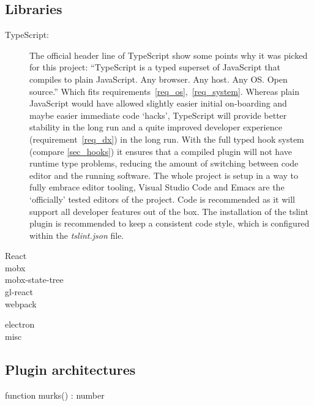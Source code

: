 \subsection{Libraries}
\begin{description}
\item[TypeScript:]  The official header line of TypeScript show some points why
  it was picked for this project: ``TypeScript is a typed superset of JavaScript that compiles
  to plain JavaScript. Any browser. Any host. Any OS\@. Open
  source.''\cite{noauthor_typescript_2018} Which fits
  requirements~\ref{req_os},~\ref{req_system}. Whereas plain JavaScript would
  have allowed slightly easier initial on-boarding and maybe easier immediate
  code `hacks', TypeScript will provide better stability in the long run and a
  quite improved developer experience (requirement~\ref{req_dx}) in the long
  run. With the full typed hook system (compare \autoref{sec_hooks}) it ensures
  that a compiled plugin will not have runtime type problems, reducing the
  amount of switching between code editor and the running software. The whole
  project is setup in a way to fully embrace editor tooling, Visual Studio
  Code\cite *{noauthor_visual_nodate} and Emacs\cite*{noauthor_gnu_nodate} are
  the `officially' tested editors of the project. Code is recommended as it will
  support all developer features out of the box. The installation of the
  tslint\cite*{noauthor_tslint_nodate} plugin\cite*{noauthor_tslint_nodate-1} is
  recommended to keep a consistent code style, which is configured within the
  \emph{tslint.json} file.
\item[React]
\item[mobx]
\item[mobx-state-tree]
\item[gl-react]
\item[webpack]\cite{renaudeau_gl-react_2018}
\item[electron]
\item[misc]\cite{noauthor_mobx:_2018}
\end{description}

\subsection{Plugin architectures}

\begin{typescript}
  function murks() : number{}
\end{typescript}

